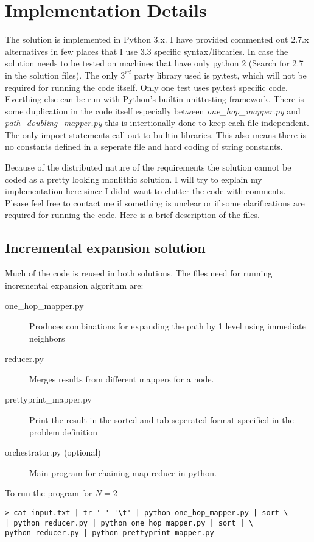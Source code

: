 \documentclass[a4paper]{article}
\begin{document}
\section{Implementation Details}
The solution is implemented in Python 3.x. I have provided commented out 2.7.x alternatives in few places that  I use 3.3 specific syntax/libraries. In case the solution needs to be tested on machines that have only python 2 (Search for 2.7 in the solution files). The only $3^{rd}$ party library used is py.test, which will not be required for running the code itself. Only one test uses py.test specific code. Everthing else can be run with Python's builtin unittesting framework. There is some duplication in the code itself especially between \emph{one\_hop\_mapper.py} and \emph{path\_doubling\_mapper.py} this is intertionally done to keep each file independent. The only import statements call out to builtin libraries. This also means there is no constants defined in a seperate file and hard coding of string constants.

Because of the distributed nature of the requirements the solution cannot be coded as a pretty looking monlithic solution. I will try to explain my implementation here since I didnt want to clutter the code with comments. Please feel free to contact me if something is unclear or if some clarifications are required for running the code. Here is a brief description of the files.

\subsection{Incremental expansion solution}
Much of the code is reused in both solutions. The files need for running incremental expansion algorithm are:

\begin{description}
    \item[one\_hop\_mapper.py] Produces combinations for expanding the path by 1 level using immediate neighbors
    \item[reducer.py] Merges results from different mappers for a node.
    \item[prettyprint\_mapper.py] Print the result in the sorted and tab seperated format specified in the problem definition
    \item[orchestrator.py (optional)] Main program for chaining map reduce in python.
\end{description}

To run the program for $N=2$
\begin{verbatim}
> cat input.txt | tr ' ' '\t' | python one_hop_mapper.py | sort \
| python reducer.py | python one_hop_mapper.py | sort | \
python reducer.py | python prettyprint_mapper.py
\end{verbatim}
\end{document}
